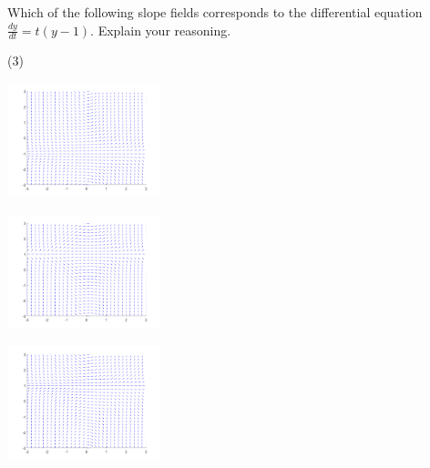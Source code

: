 \begin{exercise}
Which of the following slope fields corresponds to the differential equation $\frac{dy}{dt} = t(y-1)$. Explain your reasoning.
\begin{tasks}(3)
\task
\parbox[c]{1.75in}{\includegraphics[width=1.75in]{Images/yprimetyp1slope}}
\task
\parbox[c]{1.75in}{\includegraphics[width=1.75in]{Images/yprimetsqym1slope}}
\task
\parbox[c]{1.75in}{\includegraphics[width=1.75in]{Images/yprimetym1slope}}
\end{tasks}
\end{exercise}

